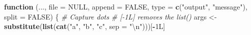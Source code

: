 \documentclass[]{book}
\newenvironment{Shaded}{\begin{snugshade}}{\end{snugshade}}
\newcommand{\CharTok}[1]{\textcolor[rgb]{0.31,0.60,0.02}{#1}}
\newcommand{\CommentTok}[1]{\textcolor[rgb]{0.56,0.35,0.01}{\textit{#1}}}
\newcommand{\ControlFlowTok}[1]{\textcolor[rgb]{0.13,0.29,0.53}{\textbf{#1}}}
\newcommand{\DataTypeTok}[1]{\textcolor[rgb]{0.13,0.29,0.53}{#1}}
\newcommand{\KeywordTok}[1]{\textcolor[rgb]{0.13,0.29,0.53}{\textbf{#1}}}
\newcommand{\NormalTok}[1]{#1}
\newcommand{\OperatorTok}[1]{\textcolor[rgb]{0.81,0.36,0.00}{\textbf{#1}}}
\newcommand{\OtherTok}[1]{\textcolor[rgb]{0.56,0.35,0.01}{#1}}
\newcommand{\StringTok}[1]{\textcolor[rgb]{0.31,0.60,0.02}{#1}}
\begin{document}
\begin{Shaded}
\begin{Highlighting}[]
\ControlFlowTok{function}\NormalTok{ (..., }\DataTypeTok{file =} \OtherTok{NULL}\NormalTok{, }\DataTypeTok{append =} \OtherTok{FALSE}\NormalTok{, }\DataTypeTok{type =} \KeywordTok{c}\NormalTok{(}\StringTok{"output"}\NormalTok{,}
                                                    \StringTok{"message"}\NormalTok{), }\DataTypeTok{split =} \OtherTok{FALSE}\NormalTok{)}
\NormalTok{\{}
  \CommentTok{# Capture dots}
  \CommentTok{# [-1L] removes the list()}
\NormalTok{  args <-}\StringTok{ }\KeywordTok{substitute}\NormalTok{(}\KeywordTok{list}\NormalTok{(}\KeywordTok{cat}\NormalTok{(}\StringTok{"a"}\NormalTok{, }\StringTok{"b"}\NormalTok{, }\StringTok{"c"}\NormalTok{, }\DataTypeTok{sep =} \StringTok{"}\CharTok{\textbackslash{}n}\StringTok{"}\NormalTok{)))[}\OperatorTok{-}\NormalTok{1L]}
  

\end{Highlighting}
\end{Shaded}
\end{document}
